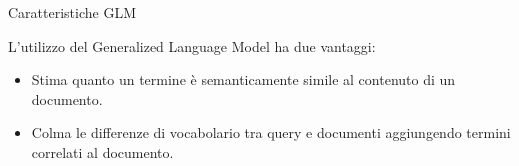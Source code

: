 \begin{frame}{Caratteristiche GLM}

    L'utilizzo del Generalized Language Model ha due vantaggi:

    \begin{itemize}
        \item Stima quanto un termine è semanticamente simile al contenuto di un documento.
        \item Colma le differenze di vocabolario tra query e documenti aggiungendo termini correlati al documento.
    \end{itemize}
\end{frame}